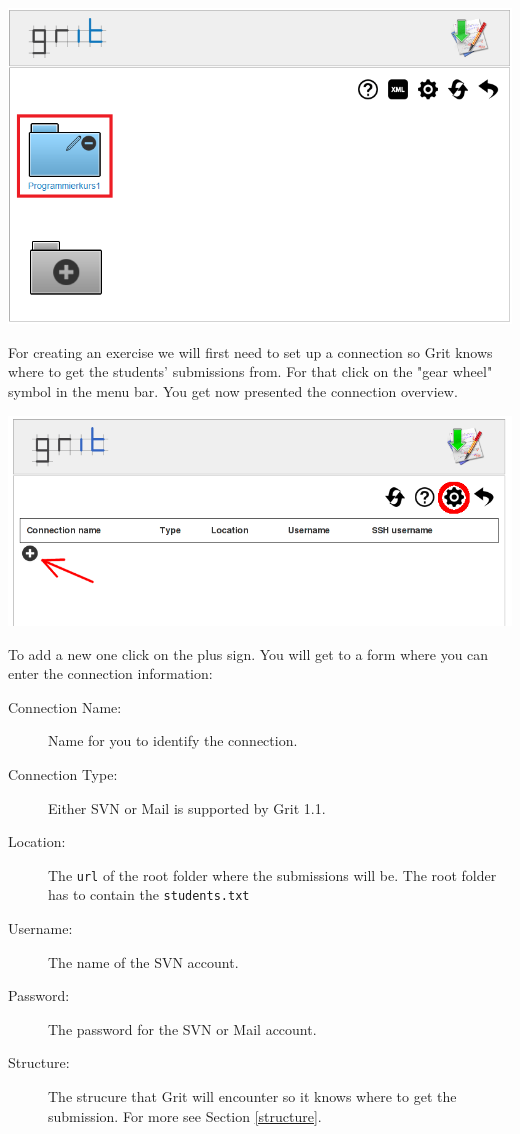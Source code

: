 \documentclass[10pt,a4paper, titlepage, toc=idx]{scrreprt}
\theoremstyle{definition}
\theoremstyle{plain}
\newcommand*{\product}{Grit}
\newcommand*{\version}{1.1}
\begin{document}
	\begin{center}
          \includegraphics[width=.55\textwidth]{pictures/created_course.png}
	\end{center}For creating an exercise we will first need to set
        up a connection so \product{} knows where to get the students'
        submissions from. For that click on the "gear wheel" symbol in
        the menu bar. You get now presented the connection overview.
	\begin{center}
          \includegraphics[width=.55\textwidth]{pictures/connection_overview.png}
	\end{center}
	To add a new one click on the plus sign. You will get to a
        form where you can enter the connection information:
	\begin{description}
        \item[Connection Name:] Name for you to identify the
          connection.
        \item[Connection Type:] Either SVN or Mail is
          supported by \product{} \version.
        \item[Location:] The {\tt url} of the root folder where the
          submissions will be. The root folder has to contain the \texttt{students.txt}
        \item[Username:] The name of the SVN account.
        \item[Password:] The password for the SVN or Mail
          account.
        \item[Structure:] The strucure that \product{} will encounter
          so it knows where to get the submission. For more see
          Section \ref{structure}.
	\end{description}
\end{document}
